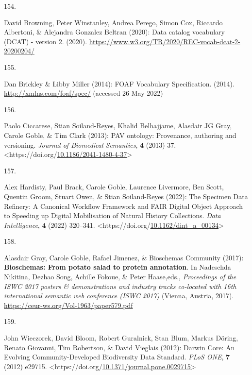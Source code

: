 \begin{thebibliography}{9}
\hypertarget{ref-w3-vocab-dcat-2}{}
154.

David Browning, Peter Winstanley, Andrea Perego, Simon Cox, Riccardo
Albertoni, \& Alejandra Gonzalez Beltran (2020): Data catalog vocabulary
({DCAT}) - version 2. (2020).
\url{https://www.w3.org/TR/2020/REC-vocab-dcat-2-20200204/}

\hypertarget{ref-FOAFVocabularySpecification}{}
155.

Dan Brickley \& Libby Miller (2014): {FOAF Vocabulary Specification}.
(2014). \url{http://xmlns.com/foaf/spec/} (accessed 26 May 2022)

\hypertarget{ref-ciccaresePAVOntologyProvenance2013e}{}
156.

Paolo Ciccarese, Stian Soiland-Reyes, Khalid Belhajjame, Alasdair JG
Gray, Carole Goble, \& Tim Clark (2013): {PAV} ontology: Provenance,
authoring and versioning. \emph{Journal of Biomedical Semantics},
\textbf{4} (2013) 37.
\textless https://doi.org/\href{https://doi.org/10.1186/2041-1480-4-37}{10.1186/2041-1480-4-37}\textgreater{}

\hypertarget{ref-hardistySpecimenDataRefinery2022a}{}
157.

Alex Hardisty, Paul Brack, Carole Goble, Laurence Livermore, Ben Scott,
Quentin Groom, Stuart Owen, \& Stian Soiland-Reyes (2022): The {Specimen
Data Refinery}: {A Canonical Workflow Framework} and {FAIR} {Digital
Object Approach} to {Speeding} up {Digital Mobilisation} of {Natural
History} {Collections}. \emph{Data Intelligence}, \textbf{4} (2022)
320--341.
\textless https://doi.org/\href{https://doi.org/10.1162/dint_a_00134}{10.1162/dint\_a\_00134}\textgreater{}

\hypertarget{ref-Bioschemas}{}
158.

Alasdair Gray, Carole Goble, Rafael Jimenez, \& Bioschemas Community
(2017): \textbf{Bioschemas: From potato salad to protein annotation}. In
Nadeschda Nikitina, Dezhao Song, Achille Fokoue, \& Peter Haase,eds.,
\emph{Proceedings of the ISWC 2017 posters \& demonstrations and
industry tracks co-located with 16th international semantic web
conference (ISWC 2017)} (Vienna, Austria, 2017).
\url{https://ceur-ws.org/Vol-1963/paper579.pdf}

\hypertarget{ref-wieczorekDarwinCoreEvolving2012}{}
159.

John Wieczorek, David Bloom, Robert Guralnick, Stan Blum, Markus Döring,
Renato Giovanni, Tim Robertson, \& David Vieglais (2012): Darwin {Core}:
{An Evolving Community-Developed Biodiversity Data Standard}. \emph{PLoS
ONE}, \textbf{7} (2012) e29715.
\textless https://doi.org/\href{https://doi.org/10.1371/journal.pone.0029715}{10.1371/journal.pone.0029715}\textgreater{}


\end{thebibliography}
